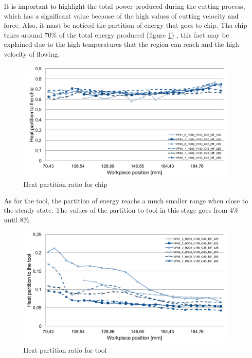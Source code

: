 	It is important to highlight the total power produced during the cutting process, which has a significant value because of the high values of cutting velocity and force. Also, it must be noticed the partition of energy that goes to chip. Tha chip takes around 70\% of the total energy produced (figure \ref{fig:hpartChip}) , this fact may be explained due to the high temperatures that the region can reach and the high velocity of flowing.

	\begin{figure}[H]
		\centering
		\captionsetup{justification=centering}
		\includegraphics[scale=0.6]{Imagens/PartChip.png}
		\caption{Heat partition ratio for chip}
		\label{fig:hpartChip}
	\end{figure}

	As for the tool, the partition of energy reachs a much smaller range when close to the steady state. The values of the partition to tool in this stage goes from 4\% until 8\%.

	\begin{figure}[H]
		\centering
		\captionsetup{justification=centering}
		\includegraphics[scale=0.6]{Imagens/partTool.png}
		\caption{Heat partition ratio for tool}
		\label{fig:hpartTool}
	\end{figure}





